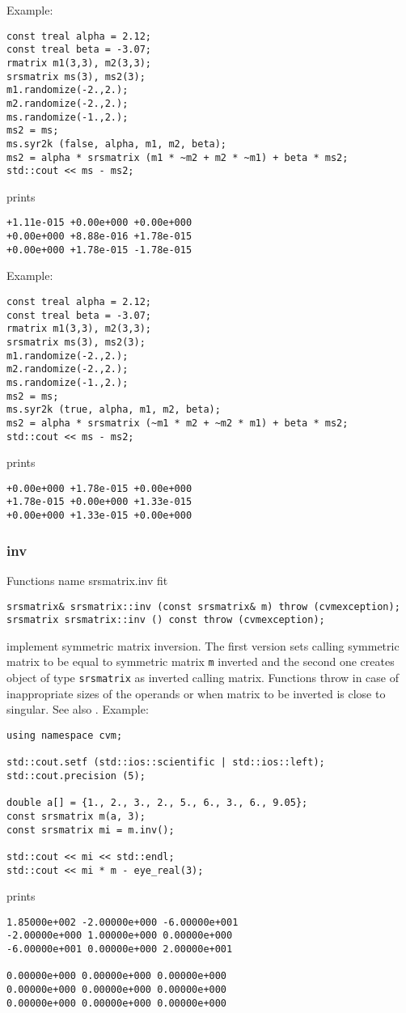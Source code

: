 Example:
\begin{Verbatim}
const treal alpha = 2.12;
const treal beta = -3.07;
rmatrix m1(3,3), m2(3,3);
srsmatrix ms(3), ms2(3);
m1.randomize(-2.,2.);
m2.randomize(-2.,2.);
ms.randomize(-1.,2.);
ms2 = ms;
ms.syr2k (false, alpha, m1, m2, beta);
ms2 = alpha * srsmatrix (m1 * ~m2 + m2 * ~m1) + beta * ms2;
std::cout << ms - ms2;
\end{Verbatim}
prints
\begin{Verbatim}
+1.11e-015 +0.00e+000 +0.00e+000
+0.00e+000 +8.88e-016 +1.78e-015
+0.00e+000 +1.78e-015 -1.78e-015
\end{Verbatim}
Example:
\begin{Verbatim}
const treal alpha = 2.12;
const treal beta = -3.07;
rmatrix m1(3,3), m2(3,3);
srsmatrix ms(3), ms2(3);
m1.randomize(-2.,2.);
m2.randomize(-2.,2.);
ms.randomize(-1.,2.);
ms2 = ms;
ms.syr2k (true, alpha, m1, m2, beta);
ms2 = alpha * srsmatrix (~m1 * m2 + ~m2 * m1) + beta * ms2;
std::cout << ms - ms2;
\end{Verbatim}
prints
\begin{Verbatim}
+0.00e+000 +1.78e-015 +0.00e+000
+1.78e-015 +0.00e+000 +1.33e-015
+0.00e+000 +1.33e-015 +0.00e+000
\end{Verbatim}
\newpage









\subsubsection{inv}
Functions%
\pdfdest name {srsmatrix.inv} fit
\begin{verbatim}
srsmatrix& srsmatrix::inv (const srsmatrix& m) throw (cvmexception);
srsmatrix srsmatrix::inv () const throw (cvmexception);
\end{verbatim}
implement symmetric matrix inversion.
The first version sets  calling symmetric matrix to be equal to 
 symmetric matrix \verb"m" inverted and the second one
creates  object of type \verb"srsmatrix" as inverted calling matrix.
Functions throw   
in case of inappropriate
sizes of the operands or when  matrix to be inverted is close to
singular.
See also
.
Example:
\begin{Verbatim}
using namespace cvm;

std::cout.setf (std::ios::scientific | std::ios::left); 
std::cout.precision (5);

double a[] = {1., 2., 3., 2., 5., 6., 3., 6., 9.05};
const srsmatrix m(a, 3);
const srsmatrix mi = m.inv();

std::cout << mi << std::endl;
std::cout << mi * m - eye_real(3);
\end{Verbatim}
prints
\begin{Verbatim}
1.85000e+002 -2.00000e+000 -6.00000e+001
-2.00000e+000 1.00000e+000 0.00000e+000
-6.00000e+001 0.00000e+000 2.00000e+001

0.00000e+000 0.00000e+000 0.00000e+000
0.00000e+000 0.00000e+000 0.00000e+000
0.00000e+000 0.00000e+000 0.00000e+000
\end{Verbatim}
\newpage




